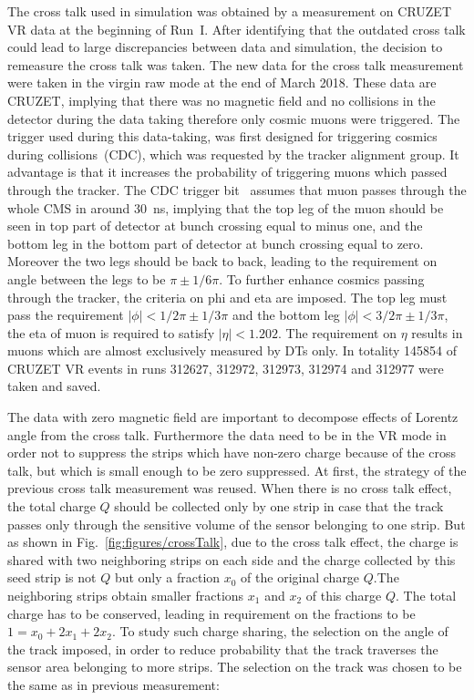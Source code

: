 The cross talk used in simulation was obtained by a measurement on CRUZET VR data at the beginning of Run~I. After identifying that the outdated cross talk could lead to large discrepancies between data and simulation, the decision  to remeasure the cross talk was taken. The new data for the cross talk measurement were taken in the virgin raw mode at the end of March 2018. These data are CRUZET, implying that there was no magnetic field and no collisions in the detector during the data taking therefore only cosmic muons were triggered. The trigger used during this data-taking, was first designed for triggering cosmics during collisions~(CDC), which was requested by the tracker alignment group. It advantage is that it increases the probability of triggering muons which passed through the tracker. The CDC trigger bit~\cite{website:trigger} assumes that muon passes through the whole CMS in around 30~ns, implying that the top leg of the muon should be seen in top part of detector at bunch crossing equal to minus one, and the bottom leg in the bottom part of detector at bunch crossing equal to zero. Moreover the two legs should be back to back, leading to the requirement on angle between the legs to be $\pi \pm 1/6\pi$. To further enhance cosmics passing through the tracker, the criteria on phi and eta are imposed. The top leg must pass the requirement $|\phi|<1/2\pi \pm 1/3\pi$ and the bottom leg $|\phi|<3/2\pi \pm 1/3\pi$, the eta of muon is required to satisfy $|\eta|<1.202$. The requirement on $\eta$ results in muons which are almost exclusively measured by DTs only. In totality 145854 of CRUZET VR events in runs 312627, 312972, 312973, 312974 and 312977 were taken and saved.

The data with zero magnetic field are important to decompose effects of Lorentz angle from the cross talk. Furthermore the data need to be in the VR mode in order not to suppress the strips which have non-zero charge because of the cross talk, but which is small enough to be zero suppressed. At first, the strategy of the previous cross talk measurement was reused. When there is no cross talk effect, the total charge $Q$ should be collected only by one strip in case that the track passes only through the sensitive volume of the sensor belonging to one strip. But as shown in Fig.~\ref{fig:figures/crossTalk}, due to the cross talk effect, the charge is shared with two neighboring strips on each side and the charge collected by this seed strip is not $Q$ but only a fraction $x_{0}$ of the original charge $Q$.The neighboring strips obtain smaller fractions $x_{1}$ and $x_{2}$ of this charge $Q$. The total charge has to be conserved, leading in requirement on the fractions to be $1=x_{0}+2x_{1}+2x_{2}$. To study such charge sharing, the selection on the angle of the track imposed, in order to reduce probability that the track traverses the sensor area belonging to more strips. The selection on the track was chosen to be the same as in previous measurement:

